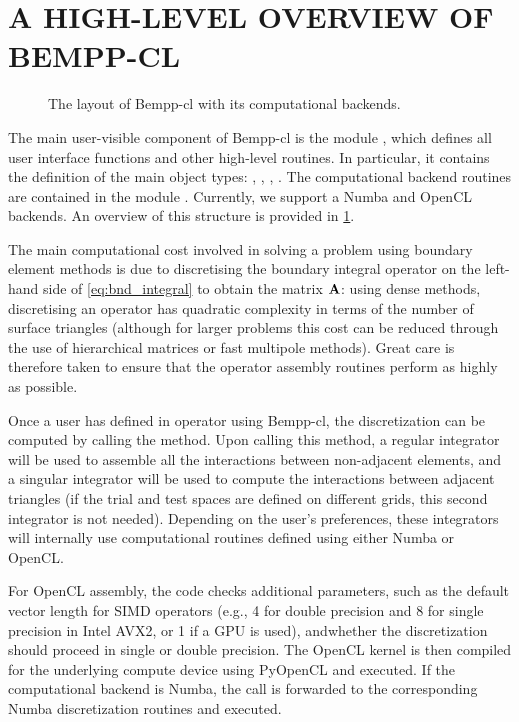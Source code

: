 \section{A HIGH-LEVEL OVERVIEW OF BEMPP-CL}

\begin{figure}
  \centering
  
  \caption{The layout of Bempp-cl with its computational backends.}
  \label{fig:overview}
\end{figure}

The main user-visible component of Bempp-cl is the module , which defines all user interface functions and other high-level routines. In particular, it contains the definition of the main object types: , , , . The computational backend routines are contained in the module . Currently, we support a Numba and OpenCL backends. An overview of this structure is provided in \cref{fig:overview}.

The main computational cost involved in solving a problem using boundary element methods is due to discretising the boundary integral operator on the left-hand side of \cref{eq:bnd_integral} to obtain the matrix $\mathbf{A}$: using dense methods, discretising an operator has quadratic complexity in terms of the number of surface triangles (although for larger problems this cost can be reduced through the use of hierarchical matrices or fast multipole methods). Great care is therefore taken to ensure that the operator assembly routines perform as highly as possible.

Once a user has defined in operator using Bempp-cl, the discretization can be computed by calling the  method. Upon calling this method, a regular integrator will be used to assemble all the interactions between non-adjacent elements, and a singular integrator will be used to compute the interactions between adjacent triangles (if the trial and test spaces are defined on different grids, this second integrator is not needed). Depending on the user's preferences, these integrators will internally use computational routines defined using either Numba or OpenCL.

For OpenCL assembly, the code checks additional parameters, such as the default vector length for SIMD operators (e.g., 4 for double precision and 8 for single precision in Intel AVX2, or 1 if a GPU is used), andwhether the discretization should proceed in single or double precision. The OpenCL kernel is then compiled for the underlying compute device using PyOpenCL and executed. If the computational backend is Numba, the call is forwarded to the corresponding Numba discretization routines and executed.

